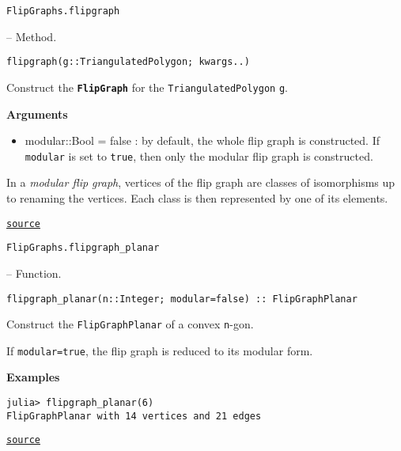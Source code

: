 \hypertarget{8931391207780679550}{\texttt{FlipGraphs.flipgraph}}  -- {Method.}

\begin{adjustwidth}{2em}{0pt}


\begin{verbatim}
flipgraph(g::TriangulatedPolygon; kwargs..)
\end{verbatim}

Construct the \textbf{\texttt{FlipGraph}} for the \texttt{TriangulatedPolygon} \texttt{g}.

\textbf{Arguments}

\begin{itemize}
\item {\textquotesingle}modular::Bool = false{\textquotesingle} : by default, the whole flip graph is constructed. If \texttt{modular} is set to \texttt{true}, then only the modular flip graph is constructed.

\end{itemize}
In a \emph{modular flip graph}, vertices of the flip graph are classes of isomorphisms up to renaming the vertices.  Each class is then represented by one of its elements.



\href{https://github.com/schto223/FlipGraphs.jl/blob/e35d43698a06b86273148826b79d585ba04fcd26/src/flipGraphPlanar.jl#L118-L127}{\texttt{source}}


\end{adjustwidth}
\hypertarget{7158471706617452188}{\texttt{FlipGraphs.flipgraph\_planar}}  -- {Function.}

\begin{adjustwidth}{2em}{0pt}


\begin{verbatim}
flipgraph_planar(n::Integer; modular=false) :: FlipGraphPlanar
\end{verbatim}

Construct the \texttt{FlipGraphPlanar} of a convex \texttt{n}-gon. 

If \texttt{modular=true}, the flip graph is reduced to its modular form.

\textbf{Examples}


\begin{verbatim}
julia> flipgraph_planar(6)
FlipGraphPlanar with 14 vertices and 21 edges
\end{verbatim}



\href{https://github.com/schto223/FlipGraphs.jl/blob/e35d43698a06b86273148826b79d585ba04fcd26/src/flipGraphPlanar.jl#L300-L312}{\texttt{source}}


\end{adjustwidth}

